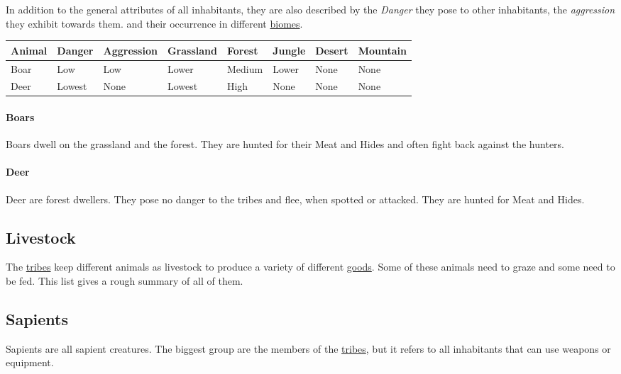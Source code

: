 In addition to the general attributes of all inhabitants, they are also
described by the \emph{Danger} they pose to other inhabitants, the
\emph{aggression} they exhibit towards them. and their occurrence in different
\hyperref[ch:World:Biomes]{biomes}.

\begin{longtable}{llllllll}
	\toprule
	Animal     & Danger & Aggression & \Gls{Grassland} & \Gls{Forest} & \Gls{Jungle} & \Gls{Desert} & \Gls{Mountain} \\
	\midrule
	\Gls{Boar} & Low    & Low        & Lower           & Medium       & Lower        & None         & None           \\
	\Gls{Deer} & Lowest & None       & Lowest          & High         & None         & None         & None           \\
	\bottomrule
\end{longtable}

\paragraph{Boars}
Boars dwell on the grassland and the forest. They are hunted for their
\gls{Meat} and \glspl{Hide} and often fight back against the hunters.

\paragraph{Deer}
Deer are forest dwellers. They pose no danger to the tribes and flee, when
spotted or attacked. They are hunted for \gls{Meat} and \glspl{Hide}.

\subsection{Livestock}\label{ch:World:Inhabitants:Livestock}

The \hyperref[ch:Tribes]{tribes} keep different animals as livestock to produce
a variety of different \hyperref[label]{goods}. Some of these animals need to
graze and some need to be fed. This list gives a rough summary of all of them.

\subsection{Sapients}\label{ch:World:Inhabitants:Sapients}

Sapients are all sapient creatures. The biggest group are the members of the
\hyperref[ch:Tribes]{tribes}, but it refers to all inhabitants that can use
weapons or equipment.

